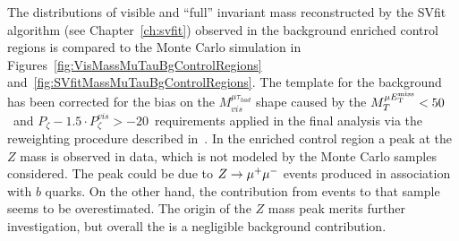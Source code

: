 The distributions of visible and ``full'' \TT invariant mass reconstructed by
the SVfit algorithm (see Chapter~\ref{ch:svfit}) observed in the background
enriched control regions is compared to the Monte Carlo simulation in
Figures~\ref{fig:VisMassMuTauBgControlRegions}
and~\ref{fig:SVfitMassMuTauBgControlRegions}.  The template for the \WpJets
background has been corrected for the bias on the $M_{vis}^{\mu \tau_{had}}$
shape caused by the $M_{T}^{\mu E_{\mathrm{T}}^{\text{miss}}} < 50$~\GeVcc and $P_{\zeta} - 1.5 \cdot
P_{\zeta}^{vis} > -20$~\GeV requirements applied in the final analysis
via the reweighting procedure described in~\cite{CMS_AN_2010-088}.  In the
\ttbarpJets enriched control region a peak at the $Z$ mass is observed in data,
which is not modeled by the Monte Carlo samples considered.  The peak could be
due to $\mbox{\ensuremath{Z\to\mu^+\mu^-}}$ events produced in association with $b$ quarks.  On the other
hand, the contribution from \ttbarpJets events to that sample seems to be
overestimated.  The origin of the $Z$ mass peak merits further investigation,
but overall the \ttbarpJets is a negligible background contribution.

